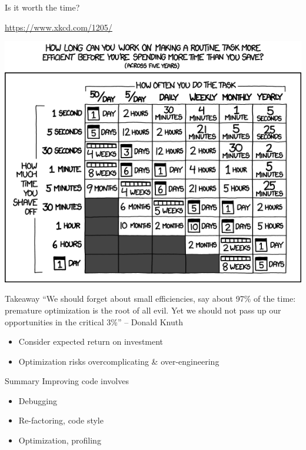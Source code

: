 \documentclass[aspectratio=169,usenames,dvipsnames]{beamer}
\begin{document}
\begin{frame}{Is it worth the time?}
    \begin{reference}\scriptsize\vspace{1em}
        \url{https://www.xkcd.com/1205/}
    \end{reference}
    \hfill\includegraphics[height=0.9\textheight]{fig/xkcdworththetime}
\end{frame}

\begin{frame}{Takeaway}
    ``We should forget about small efficiencies, say about 97\% of the time:
    premature optimization is the root of all evil. Yet we should not pass up
    our opportunities in the critical 3\%'' -- Donald Knuth

    \vspace{1em}
    \begin{itemize}
        \item Consider expected return on investment
        \item Optimization risks overcomplicating \& over-engineering
    \end{itemize}
\end{frame}

\begin{frame}{Summary}
    Improving code involves
    \begin{itemize}
        \item Debugging
        \item Re-factoring, code style
        \item Optimization, profiling
    \end{itemize}
\end{frame}
\end{document}
